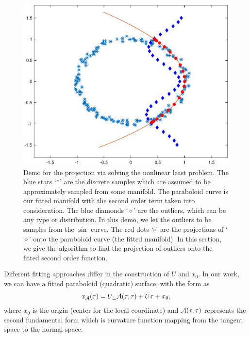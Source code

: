 \documentclass{article}
\theoremstyle{remark}
\begin{document}
\begin{figure}[h] %
   \centering
   \includegraphics[width=0.9\linewidth]{demo3.eps} 
   \caption{Demo for the projection via solving the nonlinear least problem. The blue stars `*' are the discrete samples which are assumed to be approximately sampled from some manifold. The paraboloid curve is our fitted manifold with the second order term taken into consideration. The blue diamonds `$\diamond$' are the outliers, which can be any type or distribution. In this demo, we let the outliers to be samples from the $\sin$ curve. The red dots `$\circ$' are the projections of `$\diamond$' onto the paraboloid curve (the fitted manifold). In this section, we give the algorithm to find the projection of outliers onto the fitted second order function.}
   \label{fig:demo}
\end{figure}



Different fitting approaches differ in the construction of $U$ and $x_0$.
In our work, we can have a fitted paraboloid (quadratic) surface, with the form as
\begin{equation}\label{manifold_representation}
x_{\cal A}(\tau) = U_{\perp} {\cal A} (\tau,\tau) + U \tau +x_0,
\end{equation}
where $x_0$ is the origin (center for the local coordinate) and ${\cal A} (\tau,\tau)$ represents the second fundamental form which is curvature function mapping from the tangent space to the normal space. 
\end{document}
